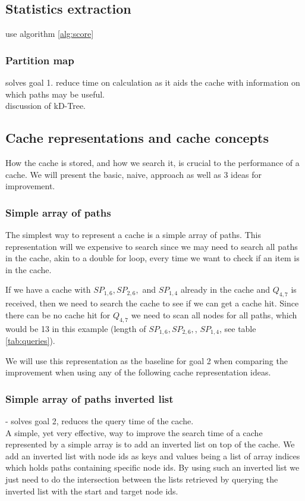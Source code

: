 


\subsection{Statistics extraction}


use algorithm \ref{alg:score}


\subsubsection{Partition map} 
solves goal 1. reduce time on \spath calculation as it aids the cache with information on which paths may be useful.\\ 
discussion of kD-Tree.


\subsection{Cache representations and cache concepts} \label{subsec:cacherepresentatons}
How the cache is stored, and how we search it, is crucial to the performance of a cache. We will present the basic, naive, approach as well as 3 ideas for improvement.
% 
\subsubsection{Simple array of paths}%
The simplest way to represent a cache is a simple array of paths. This representation will we expensive to search since we may need to search all paths in the cache, akin to a double for loop, every time we want to check if an item is in the cache.

If we have a cache with $SP_{1,6},SP_{2,6},$ and $SP_{1,4}$ already in the cache and $Q_{4,7}$ is received, then we need to search the cache to see if we can get a cache hit. Since there can be no cache hit for $Q_{4,7}$ we need to scan all nodes for all paths, which would be 13 in this example (length of $SP_{1,6},SP_{2,6},$, $SP_{1,4}$, see table \ref{tab:queries}).

We will use this representation as the baseline for goal 2 when comparing the improvement when using any of the following cache representation ideas.

\subsubsection{Simple array of paths inverted list} - solves goal 2, reduces the query time of the cache.\\
A simple, yet very effective, way to improve the search time of a cache represented by a simple array is to add an inverted list on top of the cache. We add an inverted list with node ids as keys and values being a list of array indices which holds paths containing specific node ids. By using such an inverted list we just need to do the intersection between the lists retrieved by querying the inverted list with the start and target node ids. 


